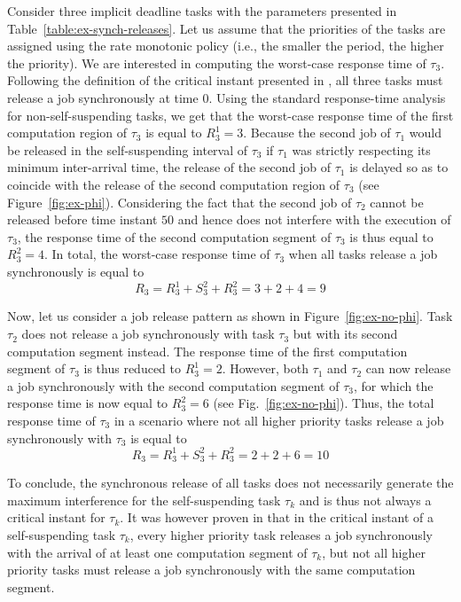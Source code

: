 Consider three implicit deadline tasks with the parameters presented in Table~\ref{table:ex-synch-releases}. Let us assume that the priorities of the tasks are assigned using the rate monotonic policy (i.e., the smaller the period, the higher the priority). We are interested in computing the worst-case response time of $\tau_3$. Following the definition of the critical instant presented in \cite{LR:rtas10}, all three tasks must release a job synchronously at time $0$. Using the standard response-time analysis for non-self-suspending tasks, we get that the worst-case response time of the first computation region of $\tau_3$ is equal to $R_3^1 = 3$. Because the second job of $\tau_1$ would be released in the self-suspending interval of $\tau_3$ if $\tau_1$ was strictly respecting its minimum inter-arrival time, the release of the second job of $\tau_1$ is delayed so as to coincide with the release of the second computation region of $\tau_3$ (see Figure~\ref{fig:ex-phi}). Considering the fact that the second job of $\tau_2$ cannot be released before time instant $50$ and hence does not interfere with the execution of $\tau_3$, the response time of the second computation segment of $\tau_3$ is thus equal to $R_3^2=4$. In total, the worst-case response time of $\tau_3$ when all tasks release a job synchronously is equal to 
$$R_3 = R_3^1 + S_3^2 + R_3^2 = 3 + 2 +4 = 9$$

Now, let us consider a job release pattern as shown in Figure~\ref{fig:ex-no-phi}. Task $\tau_2$ does not release a job synchronously with task $\tau_3$ but with its second computation segment instead. The response time of the first computation segment of $\tau_3$ is thus reduced to $R_3^1=2$. However, both $\tau_1$ and $\tau_2$ can now release a job synchronously with the second computation segment of $\tau_3$, for which the response time is now equal to $R_3^2=6$ (see Fig.~\ref{fig:ex-no-phi}). Thus, the total response time of $\tau_3$ in a scenario where not all higher priority tasks release a job synchronously with $\tau_3$ is equal to 
$$R_3 = R_3^1 + S_3^2 + R_3^2 = 2+2+6 = 10$$

To conclude, the synchronous release of all tasks does not necessarily generate the maximum interference for the self-suspending task $\tau_k$ and is thus not always a critical instant for $\tau_k$. It was however proven in \cite{ecrts15nelissen} that in the critical instant of a self-suspending task $\tau_k$, every higher priority task releases a job synchronously with the arrival of at least one computation segment of $\tau_k$, but not all higher priority tasks must release a job synchronously with the same computation segment.


